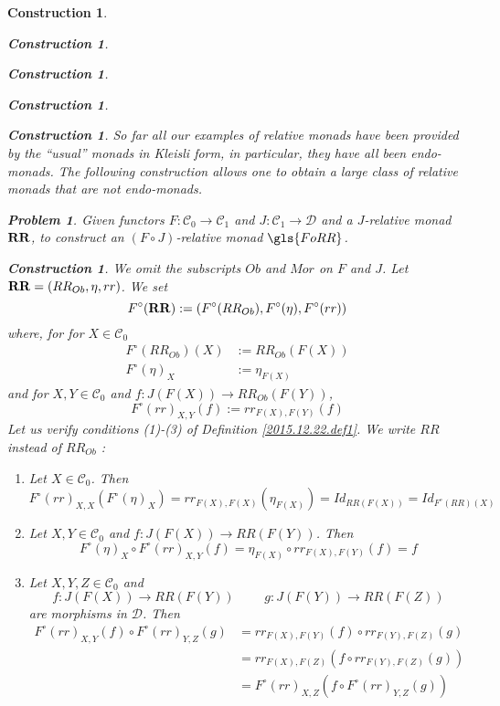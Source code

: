 \documentclass[onecolumn,12pt]{amsart}
\numberwithin{proposition}{subsection}
\newtheorem{problem}[proposition]{Problem}
\newtheorem{construction}[proposition]{Construction}
\newcommand{\sr}{\rightarrow}
\newcommand{\spc}{{\,\,\,\,\,\,\,}}
\newcommand{\RR}{{\bf RR}}
\newcommand{\C}{{\mathcal C}}
\newcommand{\D}{{\mathcal D}}
\begin{document}
\begin{construction}
\begin{construction}
\begin{construction}
\begin{construction}
\begin{construction}
So far all our examples of relative monads have been provided by the ``usual''
monads in Kleisli form, in particular, they have all been endo-monads.  The
following construction allows one to obtain a large class of relative monads
that are not endo-monads.
%
\begin{problem}\label{2017.02.24.prob1}
Given functors $F:\C_0\sr \C_1$ and $J:\C_1\sr\D$ and a $J$-relative monad $\RR$,
to construct an $(F\circ J)$-relative monad $\gls{FoRR}$.
\end{problem}
%
\begin{construction}\label{2017.02.24.constr1}\rm
We omit the subscripts $Ob$ and $Mor$ on $F$ and $J$. Let $\RR=(RR_{Ob},\eta,rr)$. We set
%
\begin{equation}
\label{2017.04.11.eq3}
F^{\circ}(\RR):=(F^{\circ}(RR_{Ob}), F^{\circ}(\eta), F^{\circ}(rr))
\end{equation}%
%
where, for for $X\in \C_0$
%
\begin{equation}
  \label{2017.04.11.eq1}
  \begin{split}
    F^{\circ}(RR_{Ob})(X)&:=RR_{Ob}(F(X))\\
    F^{\circ}(\eta)_X&:=\eta_{F(X)}
  \end{split}
\end{equation}%
%
and for $X,Y\in\C_0$ and $f:J(F(X))\sr RR_{Ob}(F(Y))$,
%
\begin{equation}
\label{2017.04.11.eq2}
F^{\circ}(rr)_{X,Y}(f):=rr_{F(X),F(Y)}(f)
\end{equation}%
%
Let us verify conditions (1)-(3) of Definition \ref{2015.12.22.def1}. We write
$RR$ instead of $RR_{Ob}$ :
%
\begin{enumerate}
\item Let $X\in\C_0$. Then 
%
$$F^{\circ}(rr)_{X,X}(F^{\circ}(\eta)_X)=rr_{F(X),F(X)}(\eta_{F(X)})=
Id_{RR(F(X))}=Id_{F^{\circ}(RR)(X)}$$
%
\item Let $X,Y\in \C_0$ and $f:J(F(X))\sr RR(F(Y))$. Then
%
$$F^{\circ}(\eta)_X\circ F^{\circ}(rr)_{X,Y}(f)=\eta_{F(X)}\circ rr_{F(X),F(Y)}(f)=f$$
%
\item Let $X,Y,Z\in \C_0$ and 
%
$$f:J(F(X))\sr RR(F(Y))\spc\spc g:J(F(Y))\sr RR(F(Z))$$
%
are morphisms in $\D$. Then
%
\begin{equation*}
  \begin{split}
    F^{\circ}(rr)_{X,Y}(f)\circ F^{\circ}(rr)_{Y,Z}(g)
      &= rr_{F(X),F(Y)}(f)\circ rr_{F(Y),F(Z)}(g)
    \\&= rr_{F(X),F(Z)}(f\circ rr_{F(Y),F(Z)}(g))
    \\&= F^{\circ}(rr)_{X,Z}(f\circ F^{\circ}(rr)_{Y,Z}(g))

\end{split}
\end{equation*}
\end{enumerate}
\end{construction}
\end{construction}
\end{construction}
\end{construction}
\end{construction}
\end{construction}
\end{document}
